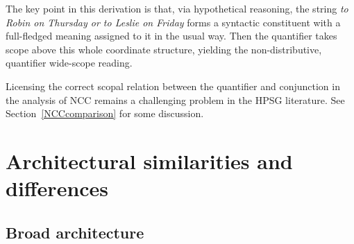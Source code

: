 \documentclass[output=paper
                ,modfonts
                ,nonflat
	        ,collection
	        ,collectionchapter
	        ,collectiontoclongg
 	        ,biblatex
                ,babelshorthands
                ,newtxmath
                ,draftmode
                ,colorlinks, citecolor=brown
]{./langsci/langscibook}
\begin{document}
\noindent The key point in this derivation is that, via hypothetical
reasoning, the string \textit{to Robin on Thursday or to Leslie on Friday}
forms a syntactic constituent with a full-fledged meaning assigned to
it in the usual way. Then the quantifier takes scope above this whole
coordinate structure, yielding the non-distributive, quantifier
wide-scope reading.

Licensing the correct scopal relation between the quantifier and
conjunction in the analysis of NCC remains a challenging problem in
the HPSG literature. See Section~\ref{NCCcomparison} for some
discussion.





\section{Architectural similarities and differences \label{architecture}}

\subsection{Broad architecture}
\end{document}
